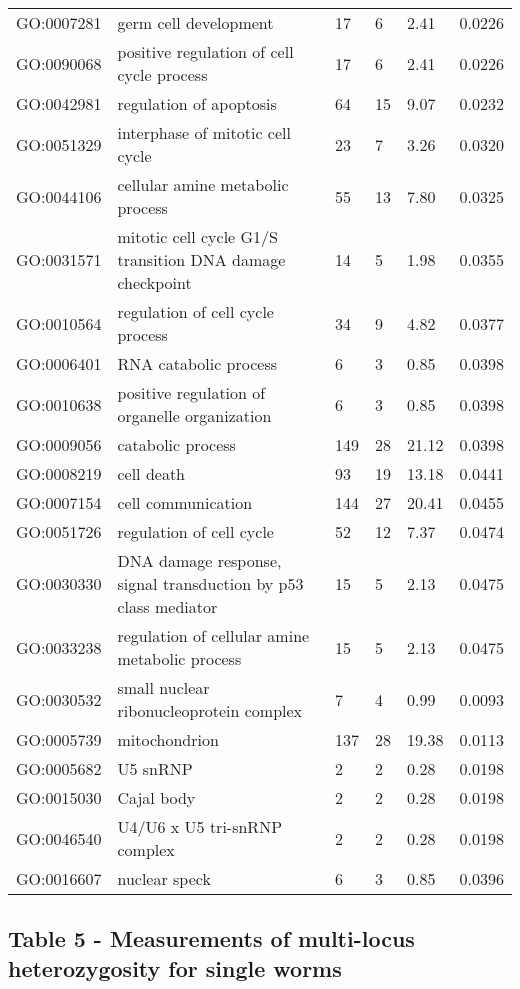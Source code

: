 \documentclass[10pt]{bmc_article}
\newenvironment{bmcformat}{\begin{raggedright}\baselineskip20pt\sloppy\setboolean{publ}{false}}{\end{raggedright}\baselineskip20pt\sloppy}
\begin{document}
\begin{bmcformat}
\begin{longtable}{lp{4.5cm}llll}
  GO:0007281 & germ cell development &  17 &   6 & 2.41 & 0.0226 \\ 
  GO:0090068 & positive regulation of cell cycle process &  17 &   6 & 2.41 & 0.0226 \\ 
  GO:0042981 & regulation of apoptosis &  64 &  15 & 9.07 & 0.0232 \\ 
  GO:0051329 & interphase of mitotic cell cycle &  23 &   7 & 3.26 & 0.0320 \\ 
  GO:0044106 & cellular amine metabolic process &  55 &  13 & 7.80 & 0.0325 \\ 
  GO:0031571 & mitotic cell cycle G1/S transition DNA damage checkpoint &  14 &   5 & 1.98 & 0.0355 \\ 
  GO:0010564 & regulation of cell cycle process &  34 &   9 & 4.82 & 0.0377 \\ 
  GO:0006401 & RNA catabolic process &   6 &   3 & 0.85 & 0.0398 \\ 
  GO:0010638 & positive regulation of organelle organization &   6 &   3 & 0.85 & 0.0398 \\ 
  GO:0009056 & catabolic process & 149 &  28 & 21.12 & 0.0398 \\ 
  GO:0008219 & cell death &  93 &  19 & 13.18 & 0.0441 \\ 
  GO:0007154 & cell communication & 144 &  27 & 20.41 & 0.0455 \\ 
  GO:0051726 & regulation of cell cycle &  52 &  12 & 7.37 & 0.0474 \\ 
  GO:0030330 & DNA damage response, signal transduction by p53 class mediator &  15 &   5 & 2.13 & 0.0475 \\ 
  GO:0033238 & regulation of cellular amine metabolic process &  15 &   5 & 2.13 & 0.0475 \\ 
   \hline
GO:0030532 & small nuclear ribonucleoprotein complex &   7 &   4 & 0.99 & 0.0093 \\ 
  GO:0005739 & mitochondrion & 137 &  28 & 19.38 & 0.0113 \\ 
  GO:0005682 & U5 snRNP &   2 &   2 & 0.28 & 0.0198 \\ 
  GO:0015030 & Cajal body &   2 &   2 & 0.28 & 0.0198 \\ 
  GO:0046540 & U4/U6 x U5 tri-snRNP complex &   2 &   2 & 0.28 & 0.0198 \\ 
  GO:0016607 & nuclear speck &   6 &   3 & 0.85 & 0.0396 \\ 
   \hline
\hline
\end{longtable}
\newpage
\subsection*{Table 5 - Measurements of multi-locus heterozygosity for
  single worms}


\end{bmcformat}
\end{document}
